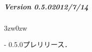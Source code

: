 { \small

%


%
\subparagraph{Version 0.5.0\hspace{1cm}2012/7/14}

\begin{description}
\begin{indentation}{3zw}{0zw}
\item[-] 0.5.0プレリリース．
\end{indentation}
\end{description}

} %
